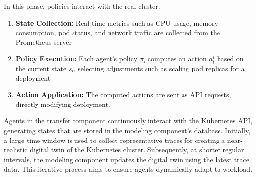 In this phase, policies interact with the real cluster:
\begin{enumerate}[label=\textbf{\arabic*)}, itemjoin={;\quad }]
    \item \textbf{State Collection:} Real-time metrics such as CPU usage, memory consumption, pod status, and network traffic are collected from the Prometheus server~\cite{prometheus}
    \item \textbf{Policy Execution:} Each agent's policy $\pi_i$ computes an action $a_t^i$ based on the current state $s_t$, selecting adjustments such as scaling pod replicas for a deployment
    \item \textbf{Action Application:} The computed actions are sent as API requests, directly modifying deployment.
\end{enumerate}

Agents in the transfer component continuously interact with the Kubernetes API, generating states that are stored in the modeling component's database. Initially, a large time window is used to collect representative traces for creating a near-realistic digital twin of the Kubernetes cluster. Subsequently, at shorter regular intervals, the modeling component updates the digital twin using the latest trace data. This iterative process aims to ensure agents dynamically adapt to workload.


%



